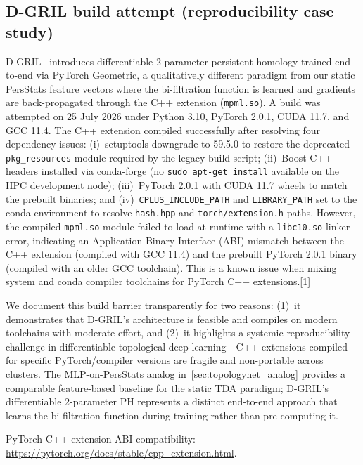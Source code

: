 \documentclass[11pt,a4paper]{article}
\begin{document}
\subsection{D-GRIL build attempt (reproducibility case study)}
\label{sec:dgril_build}

D-GRIL~\citep{dgril_2026} introduces differentiable 2-parameter persistent homology trained end-to-end via PyTorch Geometric, a qualitatively different paradigm from our static PersStats feature vectors where the bi-filtration function is learned and gradients are back-propagated through the C++ extension (\texttt{mpml.so}). A build was attempted on 25 July 2026 under Python 3.10, PyTorch 2.0.1, CUDA 11.7, and GCC 11.4. The C++ extension compiled successfully after resolving four dependency issues: (i)~setuptools downgrade to 59.5.0 to restore the deprecated \texttt{pkg\_resources} module required by the legacy build script; (ii)~Boost C++ headers installed via conda-forge (no \texttt{sudo apt-get install} available on the HPC development node); (iii)~PyTorch 2.0.1 with CUDA 11.7 wheels to match the prebuilt binaries; and (iv)~\texttt{CPLUS\_INCLUDE\_PATH} and \texttt{LIBRARY\_PATH} set to the conda environment to resolve \texttt{hash.hpp} and \texttt{torch/extension.h} paths. However, the compiled \texttt{mpml.so} module failed to load at runtime with a \texttt{libc10.so} linker error, indicating an Application Binary Interface (ABI) mismatch between the C++ extension (compiled with GCC 11.4) and the prebuilt PyTorch 2.0.1 binary (compiled with an older GCC toolchain). This is a known issue when mixing system and conda compiler toolchains for PyTorch C++ extensions.[1]

We document this build barrier transparently for two reasons: (1)~it demonstrates that D-GRIL's architecture is feasible and compiles on modern toolchains with moderate effort, and (2)~it highlights a systemic reproducibility challenge in differentiable topological deep learning—C++ extensions compiled for specific PyTorch/compiler versions are fragile and non-portable across clusters. The MLP-on-PersStats analog in~\cref{sec:topologynet_analog} provides a comparable feature-based baseline for the static TDA paradigm; D-GRIL's differentiable 2-parameter PH represents a distinct end-to-end approach that learns the bi-filtration function during training rather than pre-computing it.

\noindent [1] PyTorch C++ extension ABI compatibility: \url{https://pytorch.org/docs/stable/cpp_extension.html}.
\end{document}
